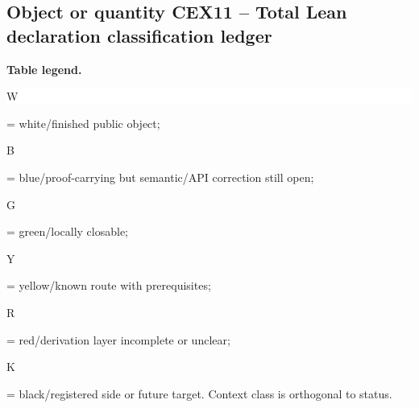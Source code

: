 \subsection*{Object or quantity CEX11 -- Total Lean declaration classification ledger}
\hypertarget{objproof:CEX11}{}
\par\smallskip\noindent\begin{minipage}{0.99\linewidth}\footnotesize\raggedright\textbf{Table legend.} \colorbox{white}{\strut W} = white/finished public object; \colorbox{cyan!20}{\strut B} = blue/proof-carrying but semantic/API correction still open; \colorbox{green!18}{\strut G} = green/locally closable; \colorbox{yellow!25}{\strut Y} = yellow/known route with prerequisites; \colorbox{red!20}{\strut R} = red/derivation layer incomplete or unclear; \colorbox{black!18}{\strut K} = black/registered side or future target. Context class is orthogonal to status.\end{minipage}\par\vspace{0.25em}
